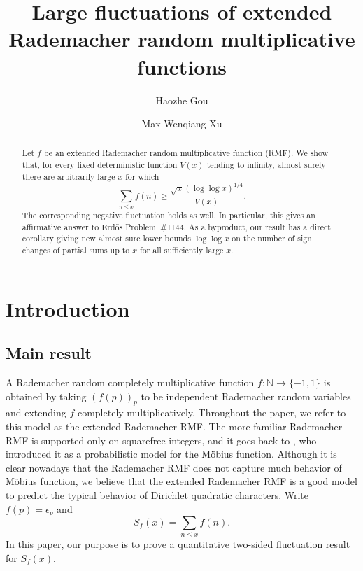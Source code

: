 \documentclass[a4paper,12pt,reqno]{amsart}
\numberwithin{equation}{section}
\theoremstyle{remark}
\newcommand{\N}{\mathbb{N}}
\begin{document}
\title[Large fluctuations]{Large fluctuations of extended Rademacher random multiplicative functions}

\author{Haozhe Gou}
\address{School of Mathematics, Shandong University, Jinan 250100, China}
\address{D\'epartement de math\'ematiques et de statistique, Universit\'e de Montr\'eal, C.P.~6128, succ.~Centre-ville, Montr\'eal, QC H3C~3J7, Canada}

\author{Max Wenqiang Xu}
\address{Yau Mathematical Sciences Center, Tsinghua University, Beijing, 100084, China}
\address{Beijing Institute of Mathematical Sciences and Applications, Beijing, 101408, China}




\begin{abstract}
Let $f$ be an extended Rademacher random multiplicative function (RMF). We show
that, for every fixed deterministic function $V(x)$ tending to infinity,
almost surely there are arbitrarily large $x$ for which
\[
 \sum_{n\leq x}f(n)
 \geq \frac{\sqrt{x}(\log\log x)^{1/4}}{V(x)}.
\]
The corresponding negative fluctuation holds as well. 
In particular, this gives an affirmative answer to Erd\H{o}s Problem~\#1144.  As a byproduct, our result has a direct corollary giving new almost sure lower bounds $\log\log x$ on the number of sign changes of partial sums up to $x$
for all sufficiently large $x$.

\end{abstract}
\maketitle

\section{Introduction}

\subsection{Main result}
A Rademacher random completely multiplicative function
$f\colon\N\rightarrow\{-1,1\}$ is obtained by taking $(f(p))_p$ to be
independent Rademacher random variables and extending $f$ completely
multiplicatively. Throughout the paper, we refer to this model as the
extended Rademacher RMF.
The more familiar Rademacher RMF is supported only on squarefree integers, and it goes back to
\citet{Wintner1944}, who introduced it as a probabilistic model for the
M\"obius function. Although it is clear nowadays that the Rademacher RMF does not capture much behavior of M\"obius function, we believe that the extended Rademacher RMF is a good model to predict the typical behavior of Dirichlet quadratic characters. 
Write $f(p)=\epsilon_p$ and
$$S_f(x)=\sum_{n\leq x}f(n).$$  
In this paper, our purpose is to prove a
quantitative two-sided fluctuation result for $S_f(x)$. 
\end{document}
